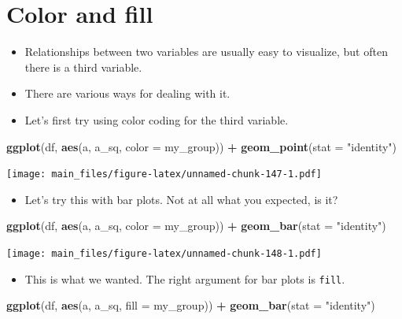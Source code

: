 \documentclass[
]{book}
\newenvironment{Shaded}{\begin{snugshade}}{\end{snugshade}}
\newcommand{\AttributeTok}[1]{\textcolor[rgb]{0.13,0.29,0.53}{#1}}
\newcommand{\FunctionTok}[1]{\textcolor[rgb]{0.13,0.29,0.53}{\textbf{#1}}}
\newcommand{\NormalTok}[1]{#1}
\newcommand{\SpecialCharTok}[1]{\textcolor[rgb]{0.81,0.36,0.00}{\textbf{#1}}}
\newcommand{\StringTok}[1]{\textcolor[rgb]{0.31,0.60,0.02}{#1}}
\providecommand{\tightlist}{%
  \setlength{\itemsep}{0pt}\setlength{\parskip}{0pt}}
\begin{document}
\section{Color and fill}\label{color-and-fill}

\begin{itemize}
\item
  Relationships between two variables are usually easy to visualize, but often there is a third variable.
\item
  There are various ways for dealing with it.
\item
  Let's first try using color coding for the third variable.
\end{itemize}

\begin{Shaded}
\begin{Highlighting}[]
\FunctionTok{ggplot}\NormalTok{(df, }\FunctionTok{aes}\NormalTok{(a, a\_sq, }\AttributeTok{color =}\NormalTok{ my\_group)) }\SpecialCharTok{+} \FunctionTok{geom\_point}\NormalTok{(}\AttributeTok{stat =} \StringTok{"identity"}\NormalTok{)}
\end{Highlighting}
\end{Shaded}

\texttt{[image: main\_files/figure-latex/unnamed-chunk-147-1.pdf]}

\begin{itemize}
\tightlist
\item
  Let's try this with bar plots. Not at all what you expected, is it?
\end{itemize}

\begin{Shaded}
\begin{Highlighting}[]
\FunctionTok{ggplot}\NormalTok{(df, }\FunctionTok{aes}\NormalTok{(a, a\_sq, }\AttributeTok{color =}\NormalTok{ my\_group)) }\SpecialCharTok{+} \FunctionTok{geom\_bar}\NormalTok{(}\AttributeTok{stat =} \StringTok{"identity"}\NormalTok{)}
\end{Highlighting}
\end{Shaded}

\texttt{[image: main\_files/figure-latex/unnamed-chunk-148-1.pdf]}

\begin{itemize}
\tightlist
\item
  This is what we wanted. The right argument for bar plots is \texttt{fill}.
\end{itemize}

\begin{Shaded}
\begin{Highlighting}[]
\FunctionTok{ggplot}\NormalTok{(df, }\FunctionTok{aes}\NormalTok{(a, a\_sq, }\AttributeTok{fill =}\NormalTok{ my\_group)) }\SpecialCharTok{+} \FunctionTok{geom\_bar}\NormalTok{(}\AttributeTok{stat =} \StringTok{"identity"}\NormalTok{)}
\end{Highlighting}
\end{Shaded}
\end{document}
